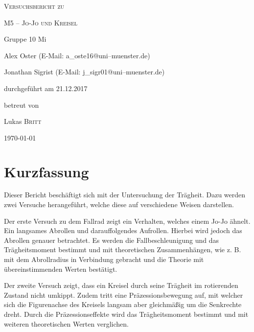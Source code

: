 \documentclass[11pt,a4paper,titlepage, ngerman]{article}
\begin{document}
	\begin{titlepage}
		\centering
		{\scshape\LARGE Versuchsbericht zu \par}
		\vspace{1cm}
		{\scshape\huge M5 -- Jo-Jo und Kreisel\par}
		\vspace{2.5cm}
		{\LARGE Gruppe 10 Mi\par}
		\vspace{0.5cm}
		{\large Alex Oster (E-Mail: a\_oste16@uni--muenster.de) \par}
		{\large Jonathan Sigrist (E-Mail: j\_sigr01@uni--muenster.de) \par}
		\vfill
		durchgeführt am 21.12.2017\par
		betreut von\par
		{\large Lukas \textsc{Britt}} 
		\vfill	
		{\large \today\par}
	\end{titlepage}
	
	\tableofcontents
	
	\newpage
	
	\section{Kurzfassung}
	
	
	Dieser Bericht beschäftigt sich mit der Untersuchung der Trägheit. Dazu werden zwei Versuche herangeführt, welche diese auf verschiedene Weisen darstellen.
	
	Der erste Versuch zu dem Fallrad zeigt ein Verhalten, welches einem Jo-Jo ähnelt. Ein langsames Abrollen und darauffolgendes Aufrollen. Hierbei wird jedoch das Abrollen genauer betrachtet. Es werden die Fallbeschleunigung und das Trägheitsmoment bestimmt und mit theoretischen Zusammenhängen, wie z. B. mit dem Abrollradius in Verbindung gebracht und die Theorie mit übereinstimmenden Werten bestätigt.
	
	Der zweite Versuch zeigt, dass ein Kreisel durch seine Trägheit im rotierenden Zustand nicht umkippt.
	Zudem tritt eine Präzessionsbewegung auf, mit welcher sich die Figurenachse des Kreisels langsam aber gleichmäßig um die Senkrechte dreht.
	Durch die Präzessionseffekte wird das Trägheitsmoment bestimmt und mit weiteren theoretischen Werten verglichen.
			
	\vspace{2cm} 
	
\end{document}
